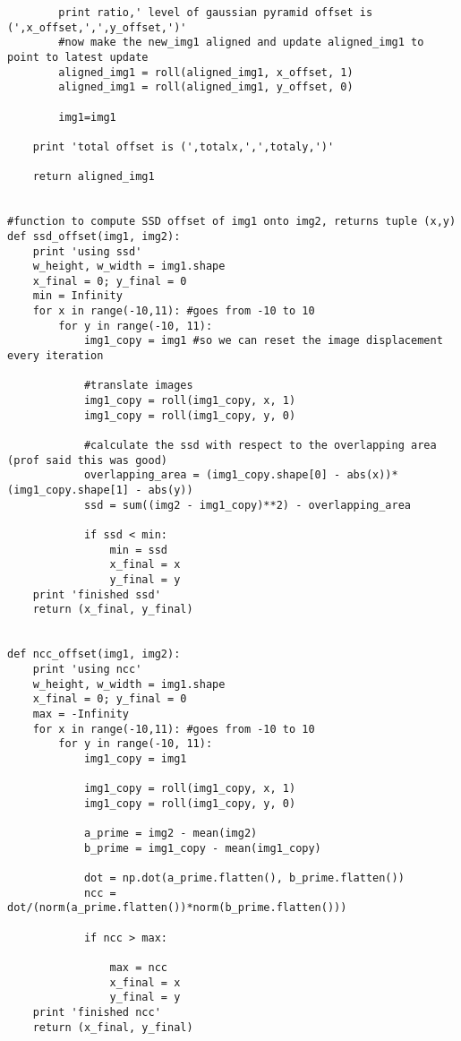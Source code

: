 \documentclass{article}
\begin{document}
\begin{lstlisting}
        print ratio,' level of gaussian pyramid offset is (',x_offset,',',y_offset,')'
        #now make the new_img1 aligned and update aligned_img1 to point to latest update
        aligned_img1 = roll(aligned_img1, x_offset, 1)
        aligned_img1 = roll(aligned_img1, y_offset, 0)
        
        img1=img1

    print 'total offset is (',totalx,',',totaly,')'
    
    return aligned_img1


#function to compute SSD offset of img1 onto img2, returns tuple (x,y)
def ssd_offset(img1, img2):
    print 'using ssd'
    w_height, w_width = img1.shape
    x_final = 0; y_final = 0
    min = Infinity
    for x in range(-10,11): #goes from -10 to 10
        for y in range(-10, 11):
            img1_copy = img1 #so we can reset the image displacement every iteration
            
            #translate images
            img1_copy = roll(img1_copy, x, 1)
            img1_copy = roll(img1_copy, y, 0)
  
            #calculate the ssd with respect to the overlapping area (prof said this was good)
            overlapping_area = (img1_copy.shape[0] - abs(x))*(img1_copy.shape[1] - abs(y))
            ssd = sum((img2 - img1_copy)**2) - overlapping_area
            
            if ssd < min:
                min = ssd
                x_final = x
                y_final = y
    print 'finished ssd'
    return (x_final, y_final)


def ncc_offset(img1, img2):
    print 'using ncc'
    w_height, w_width = img1.shape
    x_final = 0; y_final = 0
    max = -Infinity
    for x in range(-10,11): #goes from -10 to 10
        for y in range(-10, 11):
            img1_copy = img1
            
            img1_copy = roll(img1_copy, x, 1)
            img1_copy = roll(img1_copy, y, 0)
            
            a_prime = img2 - mean(img2)
            b_prime = img1_copy - mean(img1_copy)
            
            dot = np.dot(a_prime.flatten(), b_prime.flatten())
            ncc = dot/(norm(a_prime.flatten())*norm(b_prime.flatten()))
            
            if ncc > max:
                
                max = ncc
                x_final = x
                y_final = y
    print 'finished ncc'
    return (x_final, y_final)


\end{lstlisting}
\end{document}

